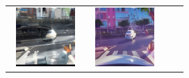 \documentclass{VUMIFPSbakalaurinis}
\begin{document}
\begin{table}[H]
{\begin{tabular}{|c|c|c|c|}
            \includegraphics[width=100,height=85]{img/diffusion/cycle/7a0ba545-3961a92c} & 
            \includegraphics[width=100,height=85]{img/diffusion/instruct/7a0ba545-3961a92c} \\

\end{tabular}}
\end{table}
\end{document}
